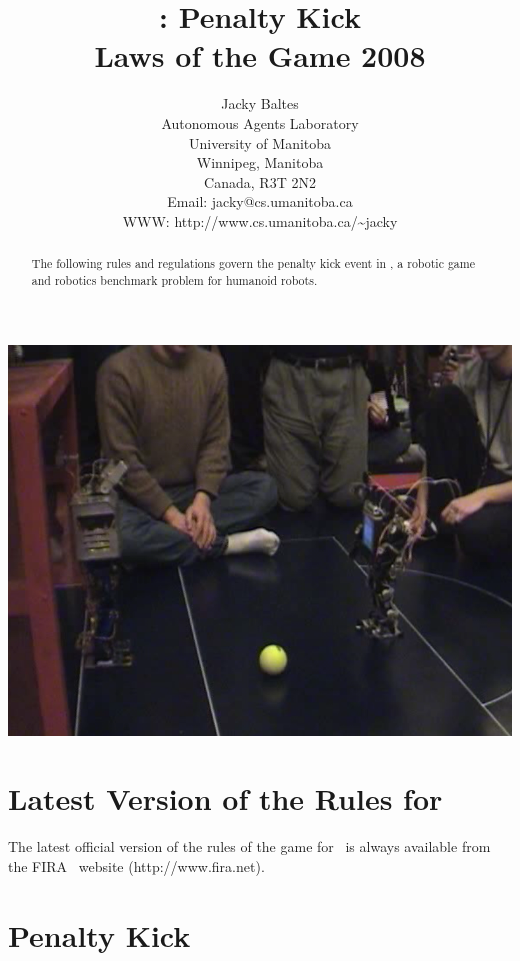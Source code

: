 \documentclass[12pt]{hurocup}
\begin{document}
\title{\HuroCup: Penalty Kick\\
  Laws of the Game 2008}


\author{Jacky Baltes\\
Autonomous Agents Laboratory\\
University of Manitoba\\
Winnipeg, Manitoba\\
Canada, R3T 2N2\\
Email: jacky@cs.umanitoba.ca\\
WWW: http://www.cs.umanitoba.ca/\~{ }jacky
}

\maketitle

\begin{center}
 \includegraphics[width=0.7\linewidth]{Figures/penalty-kick-life}
\end{center}

\begin{abstract}
The following rules and regulations govern the penalty kick event in
\HuroCup, a robotic game and robotics benchmark problem for humanoid
robots.
%
\end{abstract}

\section*{Latest Version of the Rules for \HuroCup}
\label{sec:updates}

The latest official version of the rules of the game for \HuroCup\ is
always available from the FIRA \HuroCup\ website (http://www.fira.net).

\newpage

\section{Penalty Kick}
\label{sec:penalty-kick}
\end{document}
